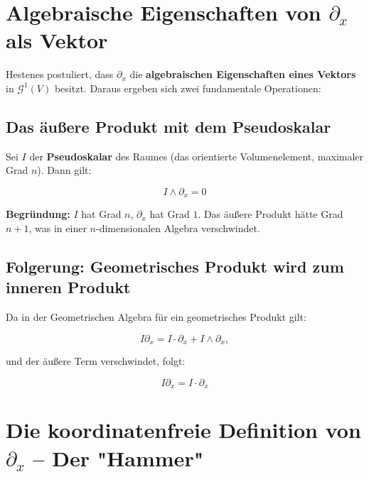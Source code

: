 \documentclass[11pt]{article}
\begin{document}
\section{Algebraische Eigenschaften von \(\partial_x\) als Vektor}

Hestenes postuliert, dass \(\partial_x\) die \textbf{algebraischen Eigenschaften eines Vektors} in \(\mathcal G^1(V)\) besitzt. Daraus ergeben sich zwei fundamentale Operationen:

\subsection{Das äußere Produkt mit dem Pseudoskalar}

Sei \(I\) der \textbf{Pseudoskalar} des Raumes (das orientierte Volumenelement, maximaler Grad \(n\)). Dann gilt:

\[
\boxed{
I \wedge \partial_x = 0
}
\]

\textbf{Begründung:} \(I\) hat Grad \(n\), \(\partial_x\) hat Grad \(1\). Das äußere Produkt hätte Grad \(n+1\), was in einer \(n\)-dimensionalen Algebra verschwindet.

\subsection{Folgerung: Geometrisches Produkt wird zum inneren Produkt}

Da in der Geometrischen Algebra für ein geometrisches Produkt gilt:

\[
I \partial_x = I \cdot \partial_x + I \wedge \partial_x,
\]

und der äußere Term verschwindet, folgt:

\[
\boxed{
I \partial_x = I \cdot \partial_x
}
\]

\begin{center}
\end{center}

\section{Die koordinatenfreie Definition von \(\partial_x\) -- Der "Hammer"}
\end{document}
